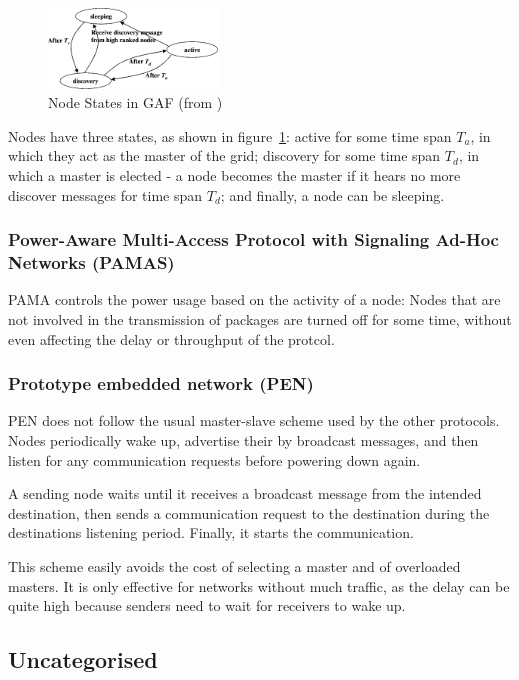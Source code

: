 \documentclass[conference]{IEEEtran}
\begin{document}
\begin{figure}
\includegraphics[width=0.4\textwidth]{images/gaf-states}
\caption{Node States in GAF (from \cite{alotaibi2012survey})}
\label{gafstates}
\end{figure}
Nodes have three states, as shown in figure~\ref{gafstates}: active for some time span $T_{a}$, in which they
act as the master of the grid; discovery for some time span $T_{d}$, in which a
master is elected - a node becomes the master if it hears no more discover messages
for time span $T_{d}$; and finally, a node can be sleeping.




\subsubsection{Power-Aware Multi-Access Protocol with Signaling Ad-Hoc Networks (PAMAS)}
PAMA\cite{singh1998pamas} controls the power usage based on the activity of
a node: Nodes that are not involved in the transmission of packages are turned
off for some time, without even affecting the delay or throughput of the
protcol.\cite{singh1998pamas}

\subsubsection{Prototype embedded network (PEN)}
PEN\cite{girling2000design} does not follow the usual master-slave scheme
used by the other protocols. Nodes periodically wake up, advertise their
by broadcast messages, and then listen for any communication requests before
powering down again.

A sending node waits until it receives a broadcast message from the intended
destination, then sends a communication request to the destination during
the destinations listening period. Finally, it starts the communication.

This scheme easily avoids the cost of selecting a master and of overloaded
masters. It is only effective for networks without much traffic, as the delay
can be quite high because senders need to wait for receivers to wake up.



\subsection{Uncategorised}
\end{document}
